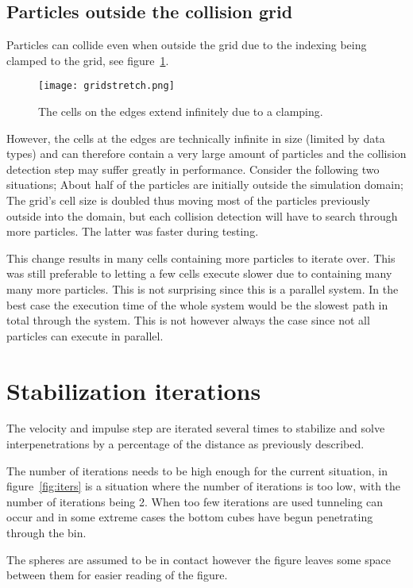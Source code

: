 \subsection{Particles outside the collision grid}
Particles can collide even when outside the grid due to the indexing
being clamped to the grid, see figure~\ref{fig:gridStretch}.

\begin{figure}[H]
  \centering
  \texttt{[image: gridstretch.png]}
  \caption{The cells on the edges extend infinitely due to a clamping.\label{fig:gridStretch}}
\end{figure}

However, the cells at the edges are technically infinite
in size (limited by data types) and can therefore contain a very large amount of particles and the collision
detection step may suffer greatly in performance. Consider the following two situations;
About half of the particles are initially outside the simulation domain; The grid's
cell size is doubled thus moving most of the particles previously outside into the domain, but
each collision detection will have to search through more particles.
The latter was faster during testing.

This change results in many cells containing more particles to iterate over. This was still preferable to
 letting a few cells execute slower due to containing many many more particles.
This is not surprising since this is a
parallel system. In the best case the execution time of the whole system would be
the slowest path in total through the system. This is not however always the case
since not all particles can execute in parallel.

\section{Stabilization iterations} \label{sec:stabil}
The velocity and impulse step are iterated several times to stabilize and solve
interpenetrations by a percentage of the distance as previously described.

The number of iterations needs to be high enough for the current situation, in
figure~\ref{fig:iters} is a situation where the number of iterations is too low, with the
number of iterations being 2. When too few iterations are used tunneling can occur
and in some extreme cases the bottom cubes have begun penetrating through the bin.

The spheres are assumed to be in contact however
the figure leaves some space between them for easier reading of the figure.

